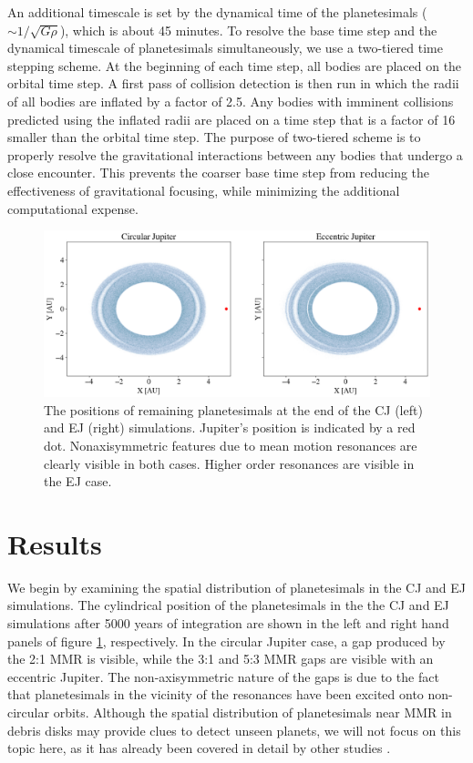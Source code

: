 \documentclass[onecolumn]{aastex63}
\begin{document}
An additional timescale is set by the dynamical time of the planetesimals ($\sim 1/\sqrt{G \rho}$), which is about 45 minutes. To 
resolve the base time step and the dynamical timescale of planetesimals simultaneously, we use a two-tiered time stepping scheme. 
At the beginning of each time step, all bodies are placed on the orbital time step. A first pass of collision detection is then run in 
which the radii of all bodies are inflated by a factor of 2.5. Any bodies with imminent collisions predicted using the inflated radii are 
placed on a time step that is a factor of 16 smaller than the orbital time step. The purpose of two-tiered scheme is to properly resolve 
the gravitational interactions between any bodies that undergo a close encounter. This prevents the coarser base time step from 
reducing the effectiveness of gravitational focusing, while minimizing the additional computational expense.

\begin{figure}
    \includegraphics[width=\textwidth]{figures/xy.png}
    \caption{The positions of remaining planetesimals at the end of the CJ (left) and EJ (right) simulations. Jupiter's position is
    indicated by a red dot. Nonaxisymmetric features due to mean motion resonances are clearly visible in both cases. Higher
    order resonances are visible in the EJ case.\label{fig:xy}}
\end{figure}

\section{Results} \label{sec:results}

We begin by examining the spatial distribution of planetesimals in the CJ and EJ simulations. The cylindrical position of the planetesimals 
in the the CJ and EJ simulations after 5000 years of integration are shown in the left and right hand panels of  figure \ref{fig:xy}, 
respectively. In the circular Jupiter case, a gap produced by the 2:1 MMR is visible, while the 3:1 and 5:3 MMR gaps are visible with an 
eccentric Jupiter. The non-axisymmetric nature of the gaps is due to the fact that planetesimals in the vicinity of the resonances have been 
excited onto non-circular orbits. Although the spatial distribution of planetesimals near MMR in debris disks may provide clues to detect 
unseen planets, we will not focus on this topic here, as it has already been covered in detail by other studies \citep{2016ApJ...818..159T, 
2018ApJ...857....3T}.
\end{document}
